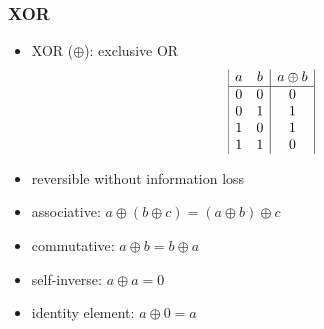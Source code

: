 \begin{frame}
  \frametitle{XOR}

  \pause
  \begin{itemize}[<+->]
    \item XOR ($\oplus$): exclusive OR
    \vspace*{1em}
    \begin{displaymath}
      \begin{array}{|c c|c|}
      a & b & a \oplus b\\
      \hline
      0 & 0 & 0\\
      0 & 1 & 1\\
      1 & 0 & 1\\
      1 & 1 & 0\\
      \end{array}
    \end{displaymath}
    \vspace*{1em}
    \item reversible without information loss
    \item associative: $a \oplus (b \oplus c) = (a \oplus b) \oplus c$
    \item commutative: $a \oplus b = b \oplus a$
    \item self-inverse: $a \oplus a = 0$
    \item identity element: $a \oplus 0 = a$
  \end{itemize}
\end{frame}

